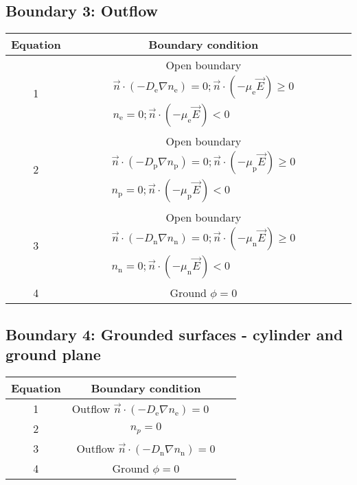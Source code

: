 \documentclass[12pt, a4paper]{report}
\begin{document}
\subsection{Boundary 3: Outflow}

\begin{table}[!h]
    \centering\begin{tabular}{|c|c|c}
        \hline
        Equation & Boundary condition\\ \hline
        1 & Open boundary $\begin{array}{c}\vec{n} \cdot\left(-D_{\mathrm{e}} \nabla n_{\mathrm{e}}\right)=0 ; \vec{n} \cdot\left(-\mu_{\mathrm{e}} \vec{E}\right) \geqslant 0 \\ n_{\mathrm{e}}=0 ; \vec{n} \cdot\left(-\mu_{\mathrm{e}} \vec{E}\right)<0\end{array} $ \\ \hline
        2 & Open boundary $\begin{array}{c}\vec{n} \cdot\left(-D_{\mathrm{p}} \nabla n_{\mathrm{p}}\right)=0 ; \vec{n} \cdot\left(-\mu_{\mathrm{p}} \vec{E}\right) \geqslant 0 \\ n_{\mathrm{p}}=0 ; \vec{n} \cdot\left(-\mu_{\mathrm{p}} \vec{E}\right)<0\end{array} $  \\ \hline
        3 & Open boundary $\begin{array}{c}\vec{n} \cdot\left(-D_{\mathrm{n}} \nabla n_{\mathrm{n}}\right)=0 ; \vec{n} \cdot\left(-\mu_{\mathrm{n}} \vec{E}\right) \geqslant 0 \\ n_{\mathrm{n}}=0 ; \vec{n} \cdot\left(-\mu_{\mathrm{n}} \vec{E}\right)<0\end{array} $ \\ \hline
        4 & Ground $\phi=0$ \\ \hline

    \end{tabular}
\end{table}

\subsection{Boundary 4: Grounded surfaces - cylinder and ground plane}

\begin{table}[!h]
    \centering\begin{tabular}{|c|c|c}
        \hline
        Equation & Boundary condition\\ \hline
        1 & Outflow $\vec{n} \cdot\left(-D_{\mathrm{e}} \nabla n_{\mathrm{e}}\right)=0\quad$ \\ \hline
        2 & $n_p=0$  \\ \hline
        3 & Outflow $\vec{n} \cdot\left(-D_{\mathrm{n}} \nabla n_{\mathrm{n}}\right)=0$\\ \hline
        4 & Ground $\phi=0$ \\ \hline

    \end{tabular}
\end{table}
\clearpage
\end{document}
